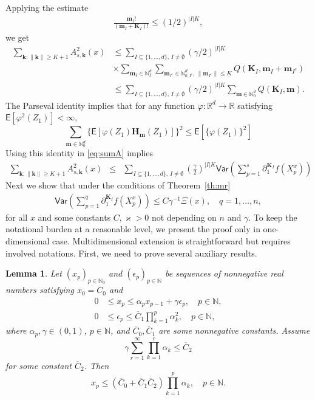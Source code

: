 \documentclass[bj]{imsart}
\def\PE{\mathsf{E}}
\def\PVar{\mathsf{Var}}
\def\nset{\mathbb{N}}
\def\rset{\mathbb{R}}
\def\rset{\mathbb{R}}
\newtheorem{lem}[thm]{Lemma}
\newcommand*{\ol}{\overline}
\begin{document}
Applying the estimate
\begin{eqnarray*}
\frac{\mathbf{m}_{I}!}{\left(\mathbf{m}_{I}+\mathbf{K}_{I}\right)!}\leq (1/2)^{|I| K},
\end{eqnarray*}
we get
\begin{align}
\label{eq:sumA}
\sum_{\mathbf{k}\colon\|\mathbf{k}\|\geq K+1}A^2_{s,\mathbf{k}}(x)
&\leq
\sum_{I\subseteq\{1,\ldots,d\},\, I\neq \emptyset} (\gamma/2)^{|I|K}
\\
\nonumber
& \times\sum_{\mathbf{m}_{I}\in\mathbb{N}_{I}^{d}} \sum_{\mathbf{m}_{I^c}\in \mathbb{N}^d_{0,I^c},\,\|\mathbf{m}_{I^c}\|\leq K} Q(\mathbf{\mathbf{K}}_{I},\mathbf{m}_{I}+\mathbf{m}_{I^c})
\\
\nonumber
&\leq
\sum_{I\subseteq\{1,\ldots,d\},\, I\neq \emptyset} (\gamma/2)^{|I|K} \sum_{\mathbf{m}\in\mathbb{N}_0^{d}} Q(\mathbf{\mathbf{K}}_{I},\mathbf{m}).
\end{align}
The Parseval identity implies that for any function $\varphi: \rset^d \to \rset$ satisfying $\PE[\varphi^2(Z_1)] < \infty$,
\[
\sum_{\mathbf{m}\in \nset^d_0} \{\PE[\varphi(Z_1) \mathbf{H}_\mathbf{m}(Z_1)] \}^2 \le \PE[\{\varphi(Z_1)\}^2]
\]
Using this identity in \eqref{eq:sumA} implies
\begin{eqnarray*}
\sum_{\mathbf{k}\colon\|\mathbf{k}\|\geq K+1}A^2_{s,\mathbf{k}}(x)
&\leq & \sum_{I\subseteq\{1,\ldots,d\},\, I\neq \emptyset}
\left(\frac{\gamma}{2}\right)^{|I|K}
\PVar\left(\sum_{p=1}^{s}\partial_{1}^{\mathbf{K}_I}f\left(X^x_{p}\right)
\right)
\end{eqnarray*}
Next we show that under the conditions  of Theorem~\ref{th:mr}
\begin{eqnarray*}
\PVar\left(\sum_{p=1}^{q}\partial_{1}^{\mathbf{K}_I}f\left(X^x_{p}\right)
\right)\leq C\gamma^{-1} \Xi(x),\quad q=1,\ldots,n,
\end{eqnarray*}
for all $x$ and some constants $C,\varkappa>0$  not depending on $n$ and $\gamma.$
To keep the notational burden at a reasonable level, we present the proof only in one-dimensional case.
Multidimensional extension is straightforward but requires involved notations.
First, we need to prove several auxiliary results.
\begin{lem}\label{lem:06062018a1}
Let $(x_p)_{p\in\mathbb N_0}$
and $(\epsilon_p)_{p\in\mathbb N}$
be sequences of nonnegative real numbers
satisfying $x_0=\ol C_0$ and
\begin{align}
0&\le x_p\le\alpha_p x_{p-1}+\gamma \epsilon_p,\quad p\in\mathbb N,
\label{eq:06062018a1}\\
0&\le\epsilon_p\le\ol C_1\prod_{k=1}^p \alpha_k^2,\quad p\in\mathbb N,
\label{eq:06062018a2}
\end{align}
where $\alpha_p,\gamma\in(0,1)$, $p\in\mathbb N$,
and $\ol C_0,\ol C_1$ are some nonnegative constants. Assume
\begin{equation}\label{eq:06062018a3}
\gamma \sum_{r=1}^\infty \prod_{k=1}^r \alpha_k\le\ol C_2
\end{equation}
for some constant $\ol C_2$. Then
$$
x_p\le(\ol C_0+\ol C_1\ol C_2)\prod_{k=1}^p \alpha_k,\quad p\in\mathbb N.
$$
\end{lem}
\end{document}
